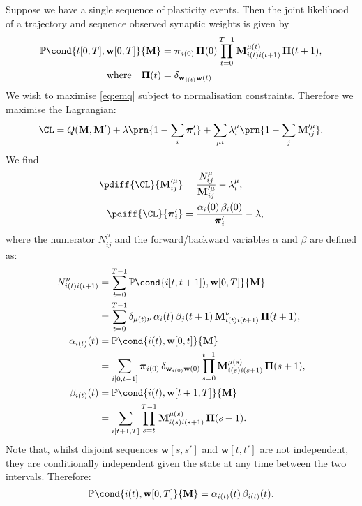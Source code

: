 \documentclass[12pt]{article}
\newcommand{\pib}{\boldsymbol{\pi}}
\newcommand{\Pib}{\boldsymbol{\Pi}}
\newcommand{\w}{\mathbf{w}}
\newcommand{\M}{\mathbf{M}}
\newcommand{\pr}{\mathbb{P}}
\begin{document}
Suppose we have a single sequence of plasticity events.
Then the joint likelihood of a trajectory and sequence observed synaptic weights is given by
%
\begin{equation}\label{eq:trajlike}
\begin{aligned}
  \pr\cond{t[0,T], \w[0,T]}{\M} &= \pib_{i(0)} \, \Pib(0) 
        \prod_{t=0}^{T-1} \M^{\mu(t)}_{i(t)i(t+1)} \, \Pib(t+1),\\
  \text{where}\quad
  \Pib(t) &= \delta_{\w_{i(t)}\w(t)}
\end{aligned}
\end{equation}
%
We wish to maximise \eqref{eq:emq} subject to normalisation constraints.
Therefore we maximise the Lagrangian:
%
\begin{equation}\label{eq:lagrangesingle}
  \CL = Q(\M,\M') + \lambda\prn{1-\sum_i\pib'_i} + \sum_{\mu i} \lambda^\mu_i\prn{1-\sum_j\M'^\mu_{ij}}. 
\end{equation}
%
We find
%
\begin{equation}\label{eq:singlediffs}
\begin{aligned}
  \pdiff{\CL}{\M'^\mu_{ij}} &= \frac{N^\mu_{ij}}{\M'^\mu_{ij}} - \lambda^\mu_{i}, \\
  \pdiff{\CL}{\pib'_{i}} &= \frac{\alpha_i(0) \, \beta_i(0)}{\pib'_{i}} - \lambda,
\end{aligned}
\end{equation}
%
where the numerator $N^\mu_{ij}$ and the forward/backward variables $\alpha$ and $\beta$ are defined as:
%
\begin{equation}\label{eq:alphabeta}
\begin{aligned}
  N^\nu_{i(t)i(t+1)} &= \sum_{t=0}^{T-1} \pr\cond{i[t,t+1]),\w[0,T]}{\M} \\
     &= \sum_{t=0}^{T-1} \delta_{\mu(t)\nu} \, \alpha_i(t) \, \beta_j(t+1) \, \M^{\nu}_{i(t)i(t+1)} \, \Pib(t+1) ,\\
  \alpha_{i(t)}(t) &= \pr\cond{i(t),\w[0,t]}{\M} \\
     &= \sum_{i[0,t-1]} \pib_{i(0)} \, \delta_{\w_{i(0)}\w(0)} \prod_{s=0}^{t-1} \M^{\mu(s)}_{i(s)i(s+1)} \, \Pib(s+1), \\
  \beta_{i(t)}(t) &= \pr\cond{i(t),\w[t+1,T]}{\M} \\
     &= \sum_{i[t+1,T]} \prod_{s=t}^{T-1} \M^{\mu(s)}_{i(s)i(s+1)} \, \Pib(s+1).
\end{aligned}
\end{equation}
%
Note that, whilst disjoint sequences $\w[s,s']$ and $\w[t,t']$ are not independent, they are conditionally independent given the state at any time between the two intervals.
Therefore:
%
\begin{equation}\label{eq:stateprob}
  \pr\cond{i(t),\w[0,T]}{\M} = \alpha_{i(t)}(t) \, \beta_{i(t)}(t).
\end{equation}
%
\end{document}
